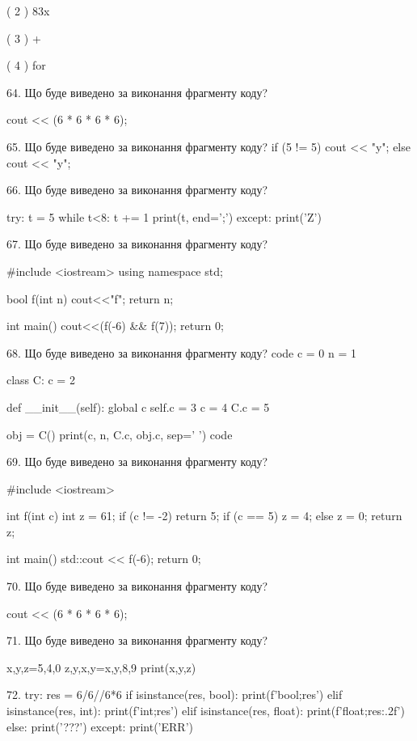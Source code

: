 \documentclass[11pt]{article}
\begin{document}
( 2 ) 83x

( 3 ) +

( 4 ) for

64. Що буде виведено за виконання фрагменту коду?

cout << (6 * 6 * 6 * 6);

65. Що буде виведено за виконання фрагменту коду?
if (5 != 5)
    cout << "y";
else
    cout << "y";


66. Що буде виведено за виконання фрагменту коду?

try:
    t = 5
    while t<8:
        t += 1
    print(t, end=';')
except:
    print('Z')


67. Що буде виведено за виконання фрагменту коду?

#include <iostream>
using namespace std;

bool f(int n){
    cout<<"f";
    return n;
}

int main(){
    cout<<(f(-6) && f(7));
    return 0;
}

68. Що буде виведено за виконання фрагменту коду?
code
c = 0
n = 1

class C:
    c = 2
    
    def __init__(self):
global c        self.c = 3
        c = 4
        C.c = 5

obj = C()
print(c, n, C.c, obj.c, sep=' ')
code

69. Що буде виведено за виконання фрагменту коду?

#include <iostream>

int f(int c){
    int z = 61;
    if (c != -2) 
        return 5;
    if (c == 5)
         z = 4;
    else
         z = 0;
    return z;
}

int main(){
    std::cout << f(-6);
    return 0;
}


70. Що буде виведено за виконання фрагменту коду?

cout << (6 * 6 * 6 * 6);

71. Що буде виведено за виконання фрагменту коду?

x,y,z=5,4,0
z,y,x,y=x,y,8,9
print(x,y,z)

72. 
try:
    res = 6/6//6*6
    if isinstance(res, bool):
        print(f'bool;{res}')
    elif isinstance(res, int):
        print(f'int;{res}')
    elif isinstance(res, float):
        print(f'float;{res:.2f}')
    else:
        print('???')
except:
    print('ERR')
\end{document}
